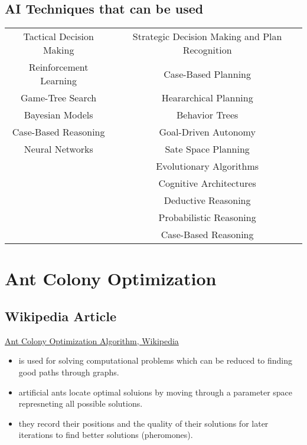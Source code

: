 \subsection{AI Techniques that can be used}
\begin{table}[h!]
	\centering
	\begin{tabular}{ c c }
		Tactical Decision Making & Strategic Decision Making and Plan Recognition\\
		Reinforcement Learning & Case-Based Planning\\
		Game-Tree Search & Heararchical Planning\\
		Bayesian Models & Behavior Trees\\
		Case-Based Reasoning & Goal-Driven Autonomy\\
		Neural Networks &  Sate Space Planning\\
		& Evolutionary Algorithms\\
		& Cognitive Architectures\\
		& Deductive Reasoning\\
		& Probabilistic Reasoning\\
		& Case-Based Reasoning\\
	\end{tabular}	
\end{table}


\section{Ant Colony Optimization}
\subsection{Wikipedia Article}
\href{https://en.wikipedia.org/wiki/Ant_colony_optimization_algorithms}{Ant Colony Optimization Algorithm, Wikipedia}
\begin{itemize}[noitemsep,nolistsep]
	\item is used for solving computational problems which can be reduced to finding good paths through graphs.
	\item artificial ants locate optimal soluions by moving through a parameter space represneting all possible solutions.
	\item they record their positions and the quality of their solutions for later iterations to find better solutions (pheromones).
\end{itemize}

